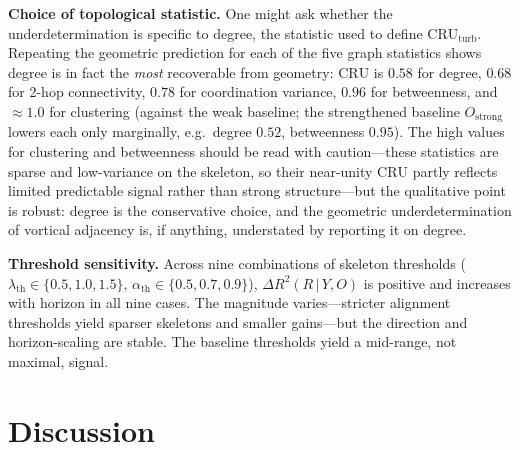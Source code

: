 \documentclass[11pt,a4paper]{article}
\begin{document}
\textbf{Choice of topological statistic.} One might ask whether the underdetermination is specific to degree, the statistic used to define $\mathrm{CRU}_{\text{turb}}$. Repeating the geometric prediction for each of the five graph statistics shows degree is in fact the \emph{most} recoverable from geometry: $\mathrm{CRU}$ is $0.58$ for degree, $0.68$ for 2-hop connectivity, $0.78$ for coordination variance, $0.96$ for betweenness, and $\approx 1.0$ for clustering (against the weak baseline; the strengthened baseline $O_{\text{strong}}$ lowers each only marginally, e.g.\ degree $0.52$, betweenness $0.95$). The high values for clustering and betweenness should be read with caution---these statistics are sparse and low-variance on the skeleton, so their near-unity $\mathrm{CRU}$ partly reflects limited predictable signal rather than strong structure---but the qualitative point is robust: degree is the conservative choice, and the geometric underdetermination of vortical adjacency is, if anything, understated by reporting it on degree.

\textbf{Threshold sensitivity.} Across nine combinations of skeleton thresholds ($\lambda_{\text{th}} \in \{0.5,1.0,1.5\}$, $\alpha_{\text{th}} \in \{0.5,0.7,0.9\}$), $\Delta R^2(R\,|\,Y,O)$ is positive and increases with horizon in all nine cases. The magnitude varies---stricter alignment thresholds yield sparser skeletons and smaller gains---but the direction and horizon-scaling are stable. The baseline thresholds yield a mid-range, not maximal, signal.

\section{Discussion}
\end{document}

